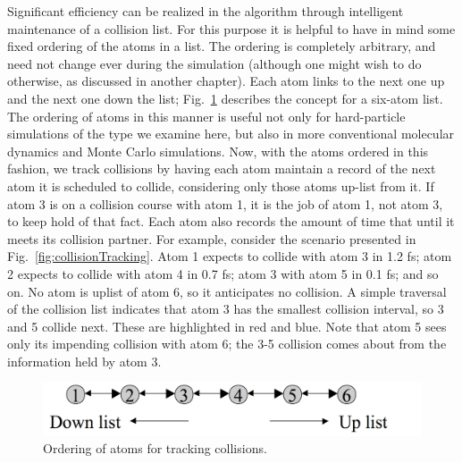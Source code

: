 \documentclass[9pt,bestpractices]{molsim}
\begin{document}
Significant efficiency can be realized in the algorithm through intelligent
maintenance of a collision list. For this purpose it is helpful to have
in mind some fixed ordering of the atoms in a list. The ordering is
completely arbitrary, and need not change ever during the simulation
(although one might wish to do otherwise, as discussed in another
chapter). Each atom links to the next one up and the next one down the
list; Fig.~\ref{fig:ordering} describes the concept for a six-atom list. The
ordering of atoms in this manner is useful not only for hard-particle
simulations of the type we examine here, but also in more conventional
molecular dynamics and Monte Carlo simulations. Now, with the atoms
ordered in this fashion, we track collisions by having each atom
maintain a record of the next atom it is scheduled to collide,
considering only those atoms up-list from it. If atom 3 is on a
collision course with atom 1, it is the job of atom 1, not atom 3, to
keep hold of that fact. Each atom also records the amount of time that
until it meets its collision partner. For example, consider the scenario
presented in Fig.~\ref{fig:collisionTracking}. Atom 1 expects to collide with atom 3 in 1.2
fs; atom 2 expects to collide with atom 4 in 0.7 fs; atom 3 with atom 5
in 0.1 fs; and so on. No atom is uplist of atom 6, so it anticipates no
collision. A simple traversal of the collision list indicates that atom
3 has the smallest collision interval, so 3 and 5 collide next. These
are highlighted in red and blue.%
Note that atom 5 sees only its impending collision with
atom 6; the 3-5 collision comes about from the information held by atom
3.

\begin{figure}
  \centering
  \includegraphics[width=\textwidth]{HSMD_figures/image040}
  \caption{\label{fig:ordering}Ordering of atoms for tracking collisions.}
\end{figure}
\end{document}
